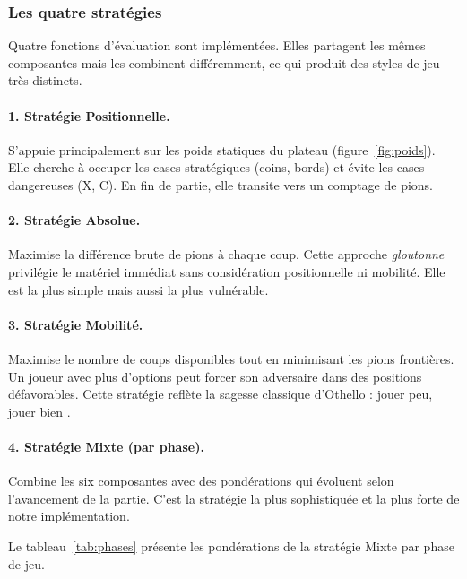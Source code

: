 \documentclass[12pt, a4paper]{article}
\begin{document}
\subsubsection{Les quatre stratégies}

Quatre fonctions d'évaluation sont implémentées. Elles partagent les mêmes composantes mais les combinent différemment, ce qui produit des styles de jeu très distincts.

\paragraph{1. Stratégie Positionnelle.}
S'appuie principalement sur les poids statiques du plateau (figure~\ref{fig:poids}). Elle cherche à occuper les cases stratégiques (coins, bords) et évite les cases dangereuses (X, C). En fin de partie, elle transite vers un comptage de pions.

\paragraph{2. Stratégie Absolue.}
Maximise la différence brute de pions à chaque coup. Cette approche \textit{gloutonne} privilégie le matériel immédiat sans considération positionnelle ni mobilité. Elle est la plus simple mais aussi la plus vulnérable.

\paragraph{3. Stratégie Mobilité.}
Maximise le nombre de coups disponibles tout en minimisant les pions frontières. Un joueur avec plus d'options peut forcer son adversaire dans des positions défavorables. Cette stratégie reflète la sagesse classique d'Othello : \og jouer peu, jouer bien \fg{}.

\paragraph{4. Stratégie Mixte (par phase).}
Combine les six composantes avec des pondérations qui évoluent selon l'avancement de la partie. C'est la stratégie la plus sophistiquée et la plus forte de notre implémentation.

\vspace{0.5em}

Le tableau~\ref{tab:phases} présente les pondérations de la stratégie Mixte par phase de jeu.
\end{document}
